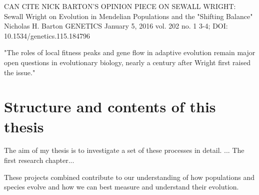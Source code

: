 CAN CITE NICK BARTON'S OPINION PIECE ON SEWALL WRIGHT:
Sewall Wright on Evolution in Mendelian Populations and the "Shifting Balance"
Nicholas H. Barton
GENETICS January 5, 2016 vol. 202 no. 1 3-4; DOI: 10.1534/genetics.115.184796

"The roles of local fitness peaks and gene flow in adaptive
evolution remain major open questions in evolutionary biology,
nearly a century after Wright first raised the issue."

\section{Structure and contents of this thesis}

The aim of my thesis is to investigate a set of these processes in detail.  ... 
The first research chapter...

These projects combined contribute to our understanding of how populations and species evolve 
and how we can best measure and understand their evolution.

